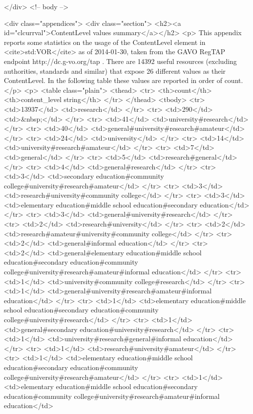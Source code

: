 </div> <!-- body -->

<div class="appendices">
<div class="section">
<h2><a id="clcurrval">ContentLevel values summary</a></h2>
<p>
This appendix reports some statistics on the usage of the ContentLevel 
element in <cite>std:VOR</cite> as of 2014-01-30, taken from the
GAVO RegTAP endpoint http://dc.g-vo.org/tap .
There are 14392 useful resources (excluding authorities, standards and
similar) that expose 26 different values as their ContentLevel.
In the following table these values are reported in order of count.
</p>
<p>
<table class="plain">
<thead>
<tr>
 <th>count</th> <th>content_level string</th>
</tr>
</thead>
<tbody>
<tr>
 <td>13937</td> <td>research</td>
</tr>
<tr>
 <td>290</td> <td>&nbsp;</td>
</tr>
<tr>
 <td>41</td> <td>university#research</td>
</tr>
<tr>
 <td>40</td> <td>general#university#research#amateur</td>
</tr>
<tr>
 <td>24</td> <td>university</td>
</tr>
<tr>
 <td>14</td> <td>university#research#amateur</td>
</tr>
<tr>
 <td>7</td> <td>general</td>
</tr>
<tr>
 <td>5</td> <td>research#general</td>
</tr>
<tr>
 <td>4</td> <td>general#research</td>
</tr>
<tr>
 <td>3</td> <td>secondary education#community college#university#research#amateur</td>
</tr>
<tr>
 <td>3</td> <td>research#university#community college</td>
</tr>
<tr>
 <td>3</td> <td>elementary education#middle school education#secondary education</td>
</tr>
<tr>
 <td>3</td> <td>general#university#research</td>
</tr>
<tr>
 <td>2</td> <td>research#university</td>
</tr>
<tr>
 <td>2</td> <td>research#amateur#university#community college</td>
</tr>
<tr>
 <td>2</td> <td>general#informal education</td>
</tr>
<tr>
 <td>2</td> <td>general#elementary education#middle school education#secondary education#community college#university#research#amateur#informal education</td>
</tr>
<tr>
 <td>1</td> <td>university#community college#research</td>
</tr>
<tr>
 <td>1</td> <td>general#university#research#amateur#informal education</td>
</tr>
<tr>
 <td>1</td> <td>elementary education#middle school education#secondary education#community college#university#research</td>
</tr>
<tr>
 <td>1</td> <td>general#secondary education#university#research</td>
</tr>
<tr>
 <td>1</td> <td>university#research#general#informal education</td>
</tr>
<tr>
 <td>1</td> <td>research#university#amateur</td>
</tr>
<tr>
 <td>1</td> <td>elementary education#middle school education#secondary education#community college#university#research#amateur</td>
</tr>
<tr>
 <td>1</td> <td>elementary education#middle school education#secondary education#community college#university#research#amateur#informal education</td>
